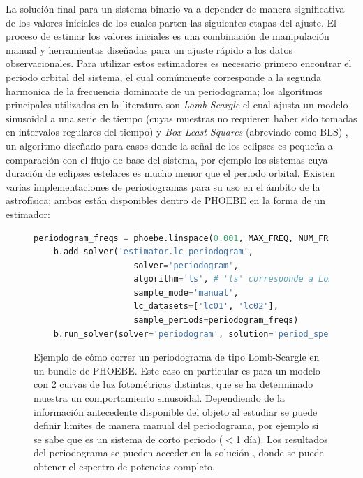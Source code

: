 La solución final para un sistema binario va a depender de manera significativa
de los valores iniciales de los cuales parten las siguientes etapas del
ajuste. El proceso de estimar los valores iniciales es una combinación de
manipulación manual y herramientas diseñadas para un ajuste rápido a los datos
observacionales. Para utilizar estos estimadores es necesario primero encontrar
el periodo orbital del sistema, el cual comúnmente corresponde a la segunda
harmonica de la frecuencia dominante de un periodograma; los algoritmos
principales utilizados en la literatura son \textit{Lomb-Scargle}
 el cual ajusta
un modelo sinusoidal a una serie de tiempo (cuyas muestras no requieren haber
sido tomadas en intervalos regulares del tiempo) y \textit{Box Least Squares}
(abreviado como BLS) ,
un algoritmo diseñado para casos donde la señal de los eclipses es pequeña a
comparación con el flujo de base del sistema, por ejemplo los sistemas cuya
duración de eclipses estelares es mucho menor que el periodo orbital. Existen
varias implementaciones de periodogramas para su uso en el ámbito de la
astrofísica; ambos están disponibles dentro de PHOEBE en la forma de un
estimador:

\begin{figure}[!ht]
	\begin{lstlisting}[language=python, autogobble]
	periodogram_freqs = phoebe.linspace(0.001, MAX_FREQ, NUM_FREQS)
	b.add_solver('estimator.lc_periodogram', 
					solver='periodogram',
					algorithm='ls', # 'ls' corresponde a Lomb-Scargle, 'bls' a BLS
					sample_mode='manual',
					lc_datasets=['lc01', 'lc02'],
					sample_periods=periodogram_freqs)
	b.run_solver(solver='periodogram', solution='period_spectrum')
	\end{lstlisting}
	\caption{Ejemplo de cómo correr un periodograma de tipo
	Lomb-Scargle en un bundle de PHOEBE. Este caso en particular es para un
	modelo con 2 curvas de luz fotométricas distintas, que se ha determinado
	muestra un comportamiento sinusoidal. Dependiendo de la información
	antecedente disponible del objeto al estudiar se puede definir limites de
	manera manual del periodograma, por ejemplo si se sabe que es un sistema de
	corto periodo ($<$1 día). Los resultados del periodograma se pueden acceder en
	la solución , donde se puede obtener el espectro de
	potencias completo.}
\end{figure}

